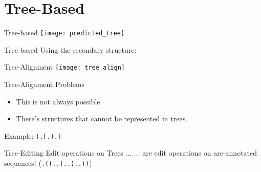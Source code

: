 \section{Tree-Based}


\begin{frame}[c]{Tree-based}
    \texttt{[image: predicted\_tree]}
\end{frame}


\begin{frame}[c]{Tree-based}
    \Large
    Using the secondary structure:
    \newline
    \newline
    \only<2>{\texttt{[image: tree\_sequences]}}
\end{frame}


\begin{frame}[c]{Tree-Alignment}
    \texttt{[image: tree\_align]}
\end{frame}

\begin{frame}[c]{Tree-Alignment Problems}
    \Large
    \begin{itemize}[<+(1)->]
        \item This is not always possible.
        \item There's structures that cannot be represented in trees.
        \newline
    \end{itemize}
    \pause
    Example: \texttt{(.[.).]}
\end{frame}



\begin{frame}[c]{Tree-Editing}
    \Large
    Edit operations on Trees ... \newline \pause
    ... are edit operations on arc-annotated sequences! \pause (\texttt{.((..(..)..))})
\end{frame}


